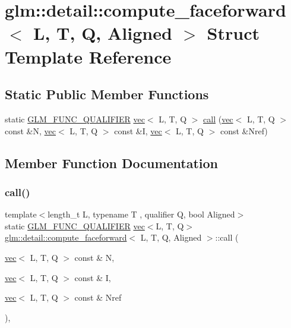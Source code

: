 \hypertarget{structglm_1_1detail_1_1compute__faceforward}{}\section{glm\+:\+:detail\+:\+:compute\+\_\+faceforward$<$ L, T, Q, Aligned $>$ Struct Template Reference}
\label{structglm_1_1detail_1_1compute__faceforward}
\subsection*{Static Public Member Functions}
\begin{DoxyCompactItemize}
\item 
static \mbox{\hyperlink{setup_8hpp_a33fdea6f91c5f834105f7415e2a64407}{G\+L\+M\+\_\+\+F\+U\+N\+C\+\_\+\+Q\+U\+A\+L\+I\+F\+I\+ER}} \mbox{\hyperlink{structglm_1_1vec}{vec}}$<$ L, T, Q $>$ \mbox{\hyperlink{structglm_1_1detail_1_1compute__faceforward_a8f885365775eabaea213e3e58d7fe0fd}{call}} (\mbox{\hyperlink{structglm_1_1vec}{vec}}$<$ L, T, Q $>$ const \&N, \mbox{\hyperlink{structglm_1_1vec}{vec}}$<$ L, T, Q $>$ const \&I, \mbox{\hyperlink{structglm_1_1vec}{vec}}$<$ L, T, Q $>$ const \&Nref)
\end{DoxyCompactItemize}


\subsection{Member Function Documentation}
\mbox{\label{structglm_1_1detail_1_1compute__faceforward_a8f885365775eabaea213e3e58d7fe0fd}} 
\subsubsection{\texorpdfstring{call()}{call()}}
{\footnotesize\ttfamily template$<$length\+\_\+t L, typename T , qualifier Q, bool Aligned$>$ \\
static \mbox{\hyperlink{setup_8hpp_a33fdea6f91c5f834105f7415e2a64407}{G\+L\+M\+\_\+\+F\+U\+N\+C\+\_\+\+Q\+U\+A\+L\+I\+F\+I\+ER}} \mbox{\hyperlink{structglm_1_1vec}{vec}}$<$L, T, Q$>$ \mbox{\hyperlink{structglm_1_1detail_1_1compute__faceforward}{glm\+::detail\+::compute\+\_\+faceforward}}$<$ L, T, Q, Aligned $>$\+::call (\begin{DoxyParamCaption}\item[{\mbox{\hyperlink{structglm_1_1vec}{vec}}$<$ L, T, Q $>$ const \&}]{N,  }\item[{\mbox{\hyperlink{structglm_1_1vec}{vec}}$<$ L, T, Q $>$ const \&}]{I,  }\item[{\mbox{\hyperlink{structglm_1_1vec}{vec}}$<$ L, T, Q $>$ const \&}]{Nref }\end{DoxyParamCaption})\hspace{0.3cm}{\ttfamily [inline]}, {\ttfamily [static]}}



